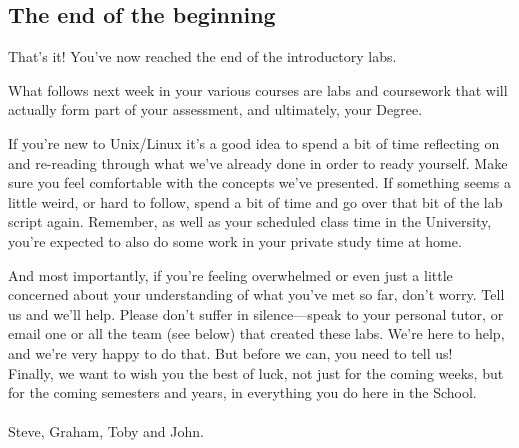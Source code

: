\begin{firstonly}

\subsection{The end of the beginning}

That's it! You've now reached the end of the introductory labs.

What follows next week in your various courses are labs and coursework
that will actually form part of your assessment, and ultimately, your
Degree.

If you're new to Unix/Linux it's a good idea to spend a bit of time
reflecting on and re-reading through what we've already done in order
to ready yourself. Make sure you feel comfortable with the concepts
we've presented. If something seems a little weird, or hard to follow,
spend a bit of time and go over that bit of the lab script
again. Remember, as well as your scheduled class time in the
University, you're expected to also do some work in your private study
time at home.

And most importantly, if you're feeling overwhelmed or even just a
little concerned about your understanding of what you've met so far,
don't worry. Tell us and we'll help.  Please don't suffer in
silence---speak to your personal tutor, or email one or all the team
(see below) that created these labs. We're here to help, and we're
very happy to do that. But before we can, you need to tell us!  \\

Finally, we want to wish you the best of luck, not just for the coming
weeks, but for the coming semesters and years, in everything you do
here in the School.\\
\\

Steve, Graham, Toby and John.


\end{firstonly}
